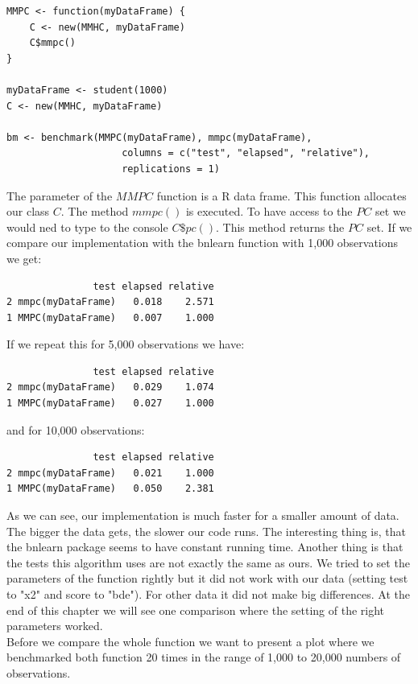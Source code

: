  	\begin{verbatim}
MMPC <- function(myDataFrame) {
    C <- new(MMHC, myDataFrame)
    C$mmpc()
}

myDataFrame <- student(1000)
C <- new(MMHC, myDataFrame)

bm <- benchmark(MMPC(myDataFrame), mmpc(myDataFrame),
					columns = c("test", "elapsed", "relative"),
					replications = 1)
 	\end{verbatim}

 	The parameter of the $MMPC$ function is a R data frame. This function allocates our class $C$. The method $mmpc()$ is executed. To have access to the $PC$ set we would ned to type to the console $C\$pc()$. This method returns the $PC$ set. If we compare our implementation with the bnlearn function with 1,000 observations we get:
	\begin{verbatim}
               test elapsed relative
2 mmpc(myDataFrame)   0.018    2.571
1 MMPC(myDataFrame)   0.007    1.000
	\end{verbatim}

	If we repeat this for 5,000 observations we have:

	\begin{verbatim}
               test elapsed relative
2 mmpc(myDataFrame)   0.029    1.074
1 MMPC(myDataFrame)   0.027    1.000
	\end{verbatim}

	and for 10,000 observations:

	\begin{verbatim}
               test elapsed relative
2 mmpc(myDataFrame)   0.021    1.000
1 MMPC(myDataFrame)   0.050    2.381
	\end{verbatim}

	As we can see, our implementation is much faster for a smaller amount of data. The bigger the data gets, the slower our code runs. The interesting thing is, that the bnlearn package seems to have constant running time. Another thing is that the tests this algorithm uses are not exactly the same as ours. We tried to set the parameters of the function rightly but it did not work with our data (setting test to "x2" and score to "bde"). For other data it did not make big differences. At the end of this chapter we will see one comparison where the setting of the right parameters worked.\\
	Before we compare the whole function we want to present a plot where we benchmarked both function 20 times in the range of 1,000 to 20,000 numbers of observations.

